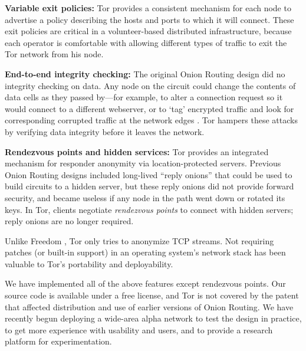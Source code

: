 \documentclass[times,10pt,twocolumn]{article}
\begin{document}
\textbf{Variable exit policies:} Tor provides a consistent mechanism
for each node to advertise a policy describing the hosts
and ports to which it will connect. These exit policies are critical
in a volunteer-based distributed infrastructure, because each operator
is comfortable with allowing different types of traffic to exit the Tor
network from his node.

\textbf{End-to-end integrity checking:} The original Onion Routing
design did no integrity checking on data. Any node on the
circuit could change the contents of data cells as they passed by---for
example, to alter a connection request so it would connect
to a different webserver, or to `tag' encrypted traffic and look for
corresponding corrupted traffic at the network edges \cite{minion-design}.
Tor hampers these attacks by verifying data integrity before it leaves
the network.


\textbf{Rendezvous points and hidden services:}
Tor provides an integrated mechanism for responder anonymity via
location-protected servers.  Previous Onion Routing designs included
long-lived ``reply onions'' that could be used to build circuits
to a hidden server, but these reply onions did not provide forward
security, and became useless if any node in the path went down
or rotated its keys.  In Tor, clients negotiate {\it rendezvous points}
to connect with hidden servers; reply onions are no longer required.


Unlike Freedom \cite{freedom2-arch}, Tor only tries to anonymize
TCP streams. Not requiring patches (or built-in support) in an
operating system's network stack has been valuable to Tor's
portability and deployability.

We have implemented all of the above features except rendezvous
points. Our source code is
available under a free license, and Tor
is not covered by the patent that affected distribution and use of
earlier versions of Onion Routing.
We have recently begun deploying a wide-area alpha network
to test the design in practice, to get more experience with usability
and users, and to provide a research platform for experimentation.
\end{document}
